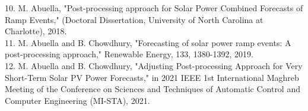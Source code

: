 \documentclass[11pt,letterpaper,sans]{moderncv}
\begin{document}
10. M. Abuella, "Post-processing approach for Solar Power Combined Forecasts of Ramp Events," (Doctoral Dissertation, University of North Carolina at Charlotte), 2018.\\
11. M. Abuella and B. Chowdhury, "Forecasting of solar power ramp events: A post-processing approach," Renewable Energy, 133, 1380-1392, 2019.\\
12. M. Abuella and B. Chowdhury, "Adjusting Post-processing Approach for Very Short-Term Solar PV Power Forecasts," in 2021 IEEE 1st International Maghreb Meeting of the Conference on Sciences and Techniques of Automatic Control and Computer Engineering (MI-STA), 2021.






\end{document}
